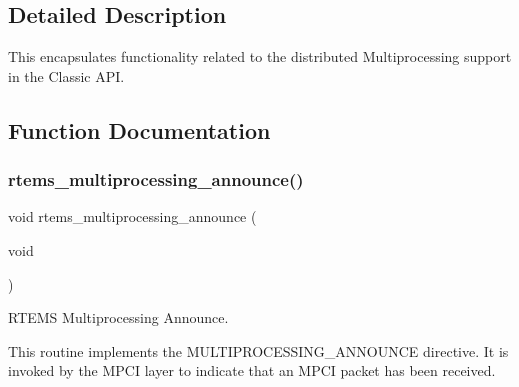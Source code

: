 \subsection{Detailed Description}
This encapsulates functionality related to the distributed Multiprocessing support in the Classic A\+PI. 

\subsection{Function Documentation}
\mbox{\label{group__ClassicMP_ga2dacfadddfd9155a1e2f7d4230ac00e0}} 
\subsubsection{\texorpdfstring{rtems\_multiprocessing\_announce()}{rtems\_multiprocessing\_announce()}}
{\footnotesize\ttfamily void rtems\+\_\+multiprocessing\+\_\+announce (\begin{DoxyParamCaption}\item[{void}]{ }\end{DoxyParamCaption})}



R\+T\+E\+MS Multiprocessing Announce. 

This routine implements the M\+U\+L\+T\+I\+P\+R\+O\+C\+E\+S\+S\+I\+N\+G\+\_\+\+A\+N\+N\+O\+U\+N\+CE directive. It is invoked by the M\+P\+CI layer to indicate that an M\+P\+CI packet has been received. 